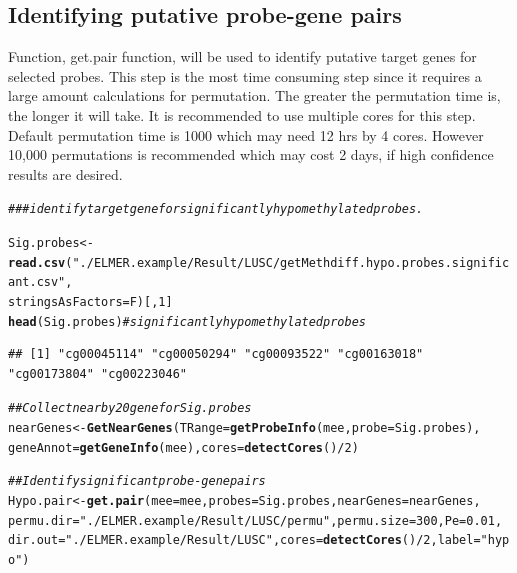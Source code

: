 \documentclass{article}\usepackage[]{graphicx}\usepackage[usenames,dvipsnames]{color}
\makeatletter
\newcommand{\hlnum}[1]{\textcolor[rgb]{0.686,0.059,0.569}{#1}}%
\newcommand{\hlstr}[1]{\textcolor[rgb]{0.192,0.494,0.8}{#1}}%
\newcommand{\hlcom}[1]{\textcolor[rgb]{0.678,0.584,0.686}{\textit{#1}}}%
\newcommand{\hlopt}[1]{\textcolor[rgb]{0,0,0}{#1}}%
\newcommand{\hlstd}[1]{\textcolor[rgb]{0.345,0.345,0.345}{#1}}%
\newcommand{\hlkwb}[1]{\textcolor[rgb]{0.69,0.353,0.396}{#1}}%
\newcommand{\hlkwc}[1]{\textcolor[rgb]{0.333,0.667,0.333}{#1}}%
\newcommand{\hlkwd}[1]{\textcolor[rgb]{0.737,0.353,0.396}{\textbf{#1}}}%
\newenvironment{kframe}{%
 \def\at@end@of@kframe{}%
 \ifinner\ifhmode%
  \def\at@end@of@kframe{\end{minipage}}%
  \begin{minipage}{\columnwidth}%
 \fi\fi%
 \def\FrameCommand##1{\hskip\@totalleftmargin \hskip-\fboxsep
 \colorbox{shadecolor}{##1}\hskip-\fboxsep
     \hskip-\linewidth \hskip-\@totalleftmargin \hskip\columnwidth}%
 \MakeFramed {\advance\hsize-\width
   \@totalleftmargin\z@ \linewidth\hsize
   \@setminipage}}%
 {\par\unskip\endMakeFramed%
 \at@end@of@kframe}
\newenvironment{knitrout}{}{} %
\makeatother
\begin{document}
\subsection{Identifying putative probe-gene pairs}
Function, get.pair function, will be used to identify putative target genes for selected probes. 
This step is the most time consuming step since it requires a large amount calculations 
for permutation. The greater the permutation time is, the longer it will take. 
It is recommended to use multiple cores for this step. Default permutation time 
is 1000 which may need 12 hrs by 4 cores. However 10,000 permutations is recommended 
which may cost 2 days, if high confidence results are desired.
\begin{knitrout}
\color{fgcolor}\begin{kframe}
\begin{alltt}
\hlcom{### identify target gene for significantly hypomethylated probes.}

\hlstd{Sig.probes} \hlkwb{<-} \hlkwd{read.csv}\hlstd{(}\hlstr{"./ELMER.example/Result/LUSC/getMethdiff.hypo.probes.significant.csv"}\hlstd{,}
                       \hlkwc{stringsAsFactors}\hlstd{=F)[,}\hlnum{1}\hlstd{]}
\hlkwd{head}\hlstd{(Sig.probes)}  \hlcom{# significantly hypomethylated probes}
\end{alltt}
\begin{verbatim}
## [1] "cg00045114" "cg00050294" "cg00093522" "cg00163018" "cg00173804" "cg00223046"
\end{verbatim}
\begin{alltt}
\hlcom{## Collect nearby 20 gene for Sig.probes}
\hlstd{nearGenes} \hlkwb{<-}\hlkwd{GetNearGenes}\hlstd{(}\hlkwc{TRange}\hlstd{=}\hlkwd{getProbeInfo}\hlstd{(mee,}\hlkwc{probe}\hlstd{=Sig.probes),}
                         \hlkwc{geneAnnot}\hlstd{=}\hlkwd{getGeneInfo}\hlstd{(mee),}\hlkwc{cores}\hlstd{=}\hlkwd{detectCores}\hlstd{()}\hlopt{/}\hlnum{2}\hlstd{)}

\hlcom{## Identify significant probe-gene pairs}
\hlstd{Hypo.pair} \hlkwb{<-}\hlkwd{get.pair}\hlstd{(}\hlkwc{mee}\hlstd{=mee,}\hlkwc{probes}\hlstd{=Sig.probes,}\hlkwc{nearGenes}\hlstd{=nearGenes,}
                     \hlkwc{permu.dir}\hlstd{=}\hlstr{"./ELMER.example/Result/LUSC/permu"}\hlstd{,}\hlkwc{permu.size}\hlstd{=}\hlnum{300}\hlstd{,}\hlkwc{Pe} \hlstd{=} \hlnum{0.01}\hlstd{,}
                     \hlkwc{dir.out}\hlstd{=}\hlstr{"./ELMER.example/Result/LUSC"}\hlstd{,}\hlkwc{cores}\hlstd{=}\hlkwd{detectCores}\hlstd{()}\hlopt{/}\hlnum{2}\hlstd{,}\hlkwc{label}\hlstd{=} \hlstr{"hypo"}\hlstd{)}
\end{alltt}



\end{kframe}
\end{knitrout}
\end{document}

